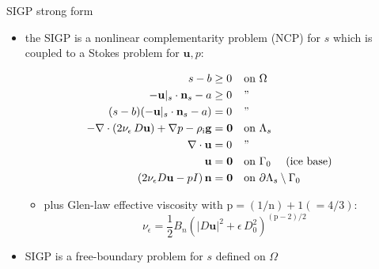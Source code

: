 \documentclass{beamer}
\newcommand{\tikzmark}[1]{\tikz[overlay,remember picture] \node (#1) {};}
\newcommand{\eps}{\epsilon}
\newcommand{\bn}{\mathbf{n}}
\newcommand{\bu}{\mathbf{u}}
\newcommand{\bzero}{\bm{0}}
\newcommand{\rhoi}{\rho_{\text{i}}}
\newcommand{\pp}{{\text{p}}}
\begin{document}
\begin{frame}{SIGP strong form}

\begin{itemize}
\item the SIGP is a \alert{nonlinear complementarity problem (NCP) for $s$ which is coupled to a Stokes problem for $\bu,p$:}

\vspace{-5mm}

\begin{align*}
s - b &\ge 0 && \text{on $\Omega$} & \tikzmark{ncptop} \\
- \bu|_s \cdot \bn_s - a &\ge 0 && \text{''} \\
(s - b) (- \bu|_s \cdot \bn_s - a) &= 0 && \text{''} & \tikzmark{ncpbot} \\
- \nabla \cdot \left(2 \nu_\eps\, D\bu\right) + \nabla p - \rhoi \mathbf{g} &= \bzero && \text{on $\Lambda_s$} & \tikzmark{gstop} \\
\nabla \cdot \bu &= 0 && \text{''} \\
\bu &= \bzero && \text{on $\Gamma_0$ \quad (ice base)} \\
\left(2 \nu_\eps D\bu - pI\right) \bn &= \bzero && \text{on $\partial \Lambda_s \setminus \Gamma_0$} & \tikzmark{gsbot}
\end{align*}



\vspace{-8mm}

    \begin{itemize}
    \item plus Glen-law effective viscosity with $\text{p}=(1/\text{n})+1(=4/3)$:
      $$\nu_\eps = \frac{1}{2} B_n \left(|D\bu|^2 + \eps\, D_0^2\right)^{(\pp-2)/2}$$
    \end{itemize}
\item SIGP is a free-boundary problem for $s$ defined on $\Omega$
\end{itemize}
\end{frame}
\end{document}
